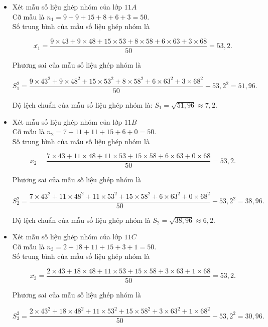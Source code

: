 \begin{bt}
{\begin{itemize}
	\item Xét mẫu số liệu ghép nhóm của lớp $11A$\\
		
		Cỡ mẫu là $n_1=9+9+15+8+6+3=50$.\\
		
		Số trung bình của mẫu số liệu ghép nhóm là
		
		$$
		\overline{x_1}=\dfrac{9 \times 43+9 \times 48+15 \times 53+8 \times 58+6 \times 63+3 \times 68}{50}=53{,}2.
		$$
		
		Phương sai của mẫu số liệu ghép nhóm là
		
		$$
		S_1^2=\dfrac{9 \times 43^2+9 \times 48^2+15 \times 53^2+8 \times 58^2+6 \times 63^2+3 \times 68^2}{50}-53{,}2^2=51{,}96.
		$$
		
		Độ lệch chuẩn của mẫu số liệu ghép nhóm là: $S_1=\sqrt{51,96} \approx 7{,}2$.
	\item Xét mẫu số liệu ghép nhóm của lớp $11B$\\
		
		Cỡ mẫu là $n_2=7+11+11+15+6+0=50$.\\
		
		Số trung bình của mẫu số liệu ghép nhóm là
		
		$$
		\overline{x_2}=\dfrac{7 \times 43+11 \times 48+11 \times 53+15 \times 58+6 \times 63+0 \times 68}{50}=53{,}2.
		$$
		
		Phương sai của mẫu số liệu ghép nhóm là
		
		$$
		S_2^2=\dfrac{7 \times 43^2+11 \times 48^2+11 \times 53^2+15 \times 58^2+6 \times 63^2+0 \times 68^2}{50}-53{,}2^2=38{,}96.
		$$
		
		Độ lệch chuẩn của mẫu số liệu ghép nhóm là $S_2=\sqrt{38{,}96}\approx 6{,}2$.\\
		
		\item Xét mẫu số liệu ghép nhóm của lớp $11C$\\
		
		Cỡ mẫu là $n_3=2+18+11+15+3+1=50$.\\
		
		Số trung bình của mẫu số liệu ghép nhóm là
		
		$$
		\overline{x_3}=\dfrac{2 \times 43+18 \times 48+11 \times 53+15 \times 58+3 \times 63+1 \times 68}{50}=53{,}2.
		$$
		
		Phương sai của mẫu số liệu ghép nhóm là
		
		$$
		S_3^2=\dfrac{2 \times 43^2+18 \times 48^2+11 \times 53^2+15 \times 58^2+3 \times 63^2+1 \times 68^2}{50}-53{,}2^2=30{,}96.
		$$
		

\end{itemize}}
\end{bt}
